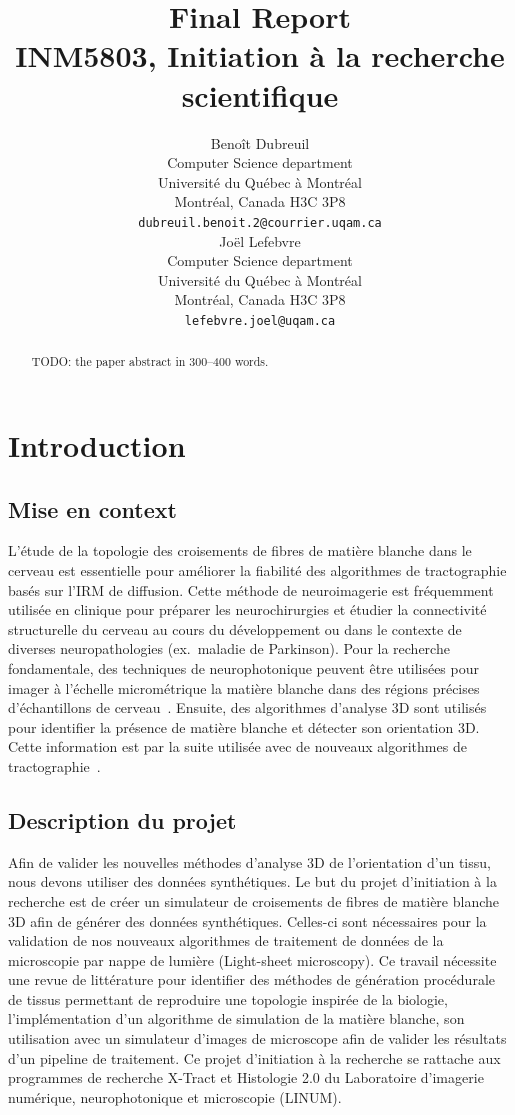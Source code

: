 \documentclass{article}
\title{
  Final Report \\
  INM5803, Initiation à la recherche scientifique}
\author{
  Benoît Dubreuil \\
  Computer Science department \\
  Université du Québec à Montréal \\
  Montréal, Canada H3C 3P8 \\
  \texttt{dubreuil.benoit.2@courrier.uqam.ca} \\
  \And
  Joël Lefebvre \\
  Computer Science department\\
  Université du Québec à Montréal \\
  Montréal, Canada H3C 3P8\\
  \texttt{lefebvre.joel@uqam.ca} \\
}
\begin{document}
  \maketitle

  \begin{abstract}
    TODO: the paper abstract in 300--400 words.
  \end{abstract}


  \section{Introduction}
  \label{sec:introduction}

  \subsection{Mise en context}
  \label{subsec:mise-en-context}
  L'étude de la topologie des croisements de fibres de matière blanche dans le cerveau est essentielle pour améliorer la fiabilité des algorithmes de tractographie
  basés sur l'IRM de diffusion.
  Cette méthode de neuroimagerie est fréquemment utilisée en clinique pour préparer les neurochirurgies et étudier la connectivité structurelle du cerveau au cours du
  développement ou dans le contexte de diverses neuropathologies (ex.\ maladie de Parkinson).
  Pour la recherche fondamentale, des techniques de neurophotonique peuvent être utilisées pour imager à l’échelle micrométrique la matière blanche dans des régions
  précises d'échantillons de cerveau~\cite{lefebvre2021oct}.
  Ensuite, des algorithmes d'analyse 3D sont utilisés pour identifier la présence de matière blanche et détecter son orientation 3D\@.
  Cette information est par la suite utilisée avec de nouveaux algorithmes de tractographie~\cite{oliveirasicard2021orientation3d}.

  \subsection{Description du projet}
  \label{subsec:description-du-projet}
  Afin de valider les nouvelles méthodes d'analyse 3D de l'orientation d’un tissu, nous devons utiliser des données synthétiques.
  Le but du projet d'initiation à la recherche est de créer un simulateur de croisements de fibres de matière blanche 3D afin de générer des données synthétiques.
  Celles-ci sont nécessaires pour la validation de nos nouveaux algorithmes de traitement de données de la microscopie par nappe de lumière (Light-sheet microscopy).
  Ce travail nécessite une revue de littérature pour identifier des méthodes de génération procédurale de tissus permettant de reproduire une topologie inspirée de
  la biologie, l'implémentation d'un algorithme de simulation de la matière blanche, son utilisation avec un simulateur d'images de microscope afin de valider les
  résultats d'un pipeline de traitement.
  Ce projet d'initiation à la recherche se rattache aux programmes de recherche X-Tract et Histologie 2.0 du Laboratoire d’imagerie numérique, neurophotonique et
  microscopie (LINUM).
\end{document}
